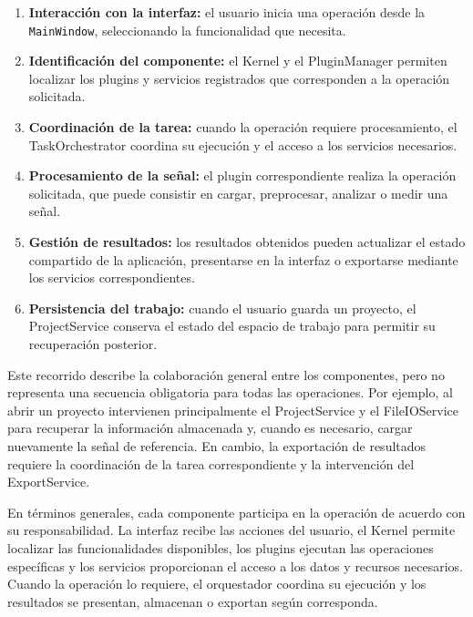 \documentclass[11pt,a4paper]{article}
\DeclareRobustCommand{\_}{\textunderscore\allowbreak}
\begin{document}
\begin{enumerate}
    \item \textbf{Interacción con la interfaz:} el usuario inicia una operación desde la \texttt{MainWindow}, seleccionando la funcionalidad que necesita.

    \item \textbf{Identificación del componente:} el Kernel y el PluginManager permiten localizar los plugins y servicios registrados que corresponden a la operación solicitada.

    \item \textbf{Coordinación de la tarea:} cuando la operación requiere procesamiento, el TaskOrchestrator coordina su ejecución y el acceso a los servicios necesarios.

    \item \textbf{Procesamiento de la señal:} el plugin correspondiente realiza la operación solicitada, que puede consistir en cargar, preprocesar, analizar o medir una señal.

    \item \textbf{Gestión de resultados:} los resultados obtenidos pueden actualizar el estado compartido de la aplicación, presentarse en la interfaz o exportarse mediante los servicios correspondientes.

    \item \textbf{Persistencia del trabajo:} cuando el usuario guarda un proyecto, el ProjectService conserva el estado del espacio de trabajo para permitir su recuperación posterior.
\end{enumerate}

Este recorrido describe la colaboración general entre los componentes, pero no representa una secuencia obligatoria para todas las operaciones. Por ejemplo, al abrir un proyecto intervienen principalmente el ProjectService y el FileIOService para recuperar la información almacenada y, cuando es necesario, cargar nuevamente la señal de referencia. En cambio, la exportación de resultados requiere la coordinación de la tarea correspondiente y la intervención del ExportService.

En términos generales, cada componente participa en la operación de acuerdo con su responsabilidad. La interfaz recibe las acciones del usuario, el Kernel permite localizar las funcionalidades disponibles, los plugins ejecutan las operaciones específicas y los servicios proporcionan el acceso a los datos y recursos necesarios. Cuando la operación lo requiere, el orquestador coordina su ejecución y los resultados se presentan, almacenan o exportan según corresponda.
\end{document}
